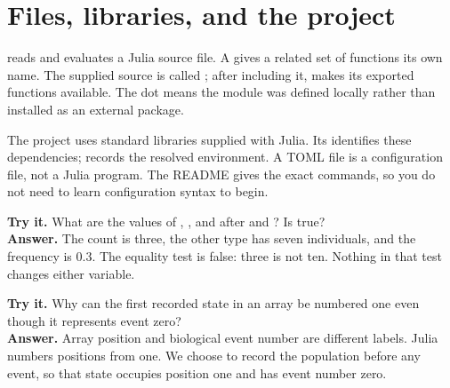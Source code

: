 \section{Files, libraries, and the project}
 reads and evaluates a Julia source file. A  gives a related set of functions its own name. The supplied source is called ; after including it,  makes its exported functions available. The dot means the module was defined locally rather than installed as an external package.

The project uses standard libraries supplied with Julia. Its  identifies these dependencies;  records the resolved environment. A TOML file is a configuration file, not a Julia program. The README gives the exact commands, so you do not need to learn configuration syntax to begin.

\begin{checkpoint}
\textbf{Try it.} What are the values of , , and  after  and ? Is  true?\\[3pt]
\textbf{Answer.} The count is three, the other type has seven individuals, and the frequency is \(0.3\). The equality test is false: three is not ten. Nothing in that test changes either variable.
\end{checkpoint}

\begin{checkpoint}
\textbf{Try it.} Why can the first recorded state in an array be numbered one even though it represents event zero?\\[3pt]
\textbf{Answer.} Array position and biological event number are different labels. Julia numbers positions from one. We choose to record the population before any event, so that state occupies position one and has event number zero.
\end{checkpoint}
